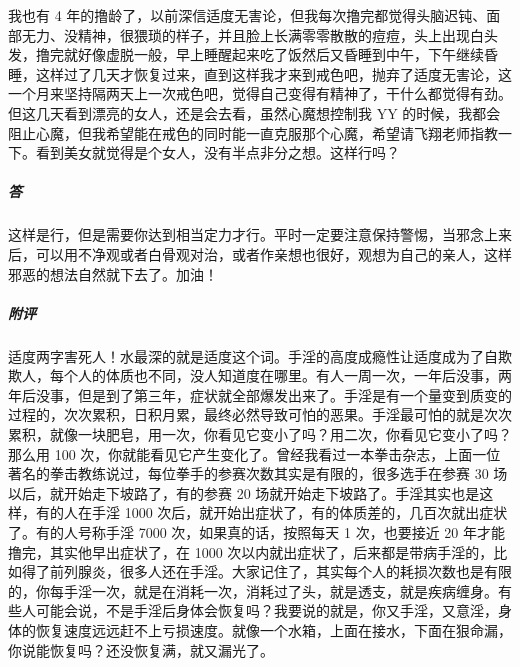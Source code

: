 \begin{case}
    我也有 4 年的撸龄了，以前深信适度无害论，但我每次撸完都觉得头脑迟钝、面部无力、没精神，很猥琐的样子，并且脸上长满零零散散的痘痘，头上出现白头发，撸完就好像虚脱一般，早上睡醒起来吃了饭然后又昏睡到中午，下午继续昏睡，这样过了几天才恢复过来，直到这样我才来到戒色吧，抛弃了适度无害论，这一个月来坚持隔两天上一次戒色吧，觉得自己变得有精神了，干什么都觉得有劲。但这几天看到漂亮的女人，还是会去看，虽然心魔想控制我 YY 的时候，我都会阻止心魔，但我希望能在戒色的同时能一直克服那个心魔，希望请飞翔老师指教一下。看到美女就觉得是个女人，没有半点非分之想。这样行吗？
    \subparagraph{答} 这样是行，但是需要你达到相当定力才行。平时一定要注意保持警惕，当邪念上来后，可以用不净观或者白骨观对治，或者作亲想也很好，观想为自己的亲人，这样邪恶的想法自然就下去了。加油！
    \subparagraph{附评} 适度两字害死人！水最深的就是适度这个词。手淫的高度成瘾性让适度成为了自欺欺人，每个人的体质也不同，没人知道度在哪里。有人一周一次，一年后没事，两年后没事，但是到了第三年，症状就全部爆发出来了。手淫是有一个量变到质变的过程的，次次累积，日积月累，最终必然导致可怕的恶果。手淫最可怕的就是次次累积，就像一块肥皂，用一次，你看见它变小了吗？用二次，你看见它变小了吗？那么用 100 次，你就能看见它产生变化了。曾经我看过一本拳击杂志，上面一位著名的拳击教练说过，每位拳手的参赛次数其实是有限的，很多选手在参赛 30 场以后，就开始走下坡路了，有的参赛 20 场就开始走下坡路了。手淫其实也是这样，有的人在手淫 1000 次后，就开始出症状了，有的体质差的，几百次就出症状了。有的人号称手淫 7000 次，如果真的话，按照每天 1 次，也要接近 20 年才能撸完，其实他早出症状了，在 1000 次以内就出症状了，后来都是带病手淫的，比如得了前列腺炎，很多人还在手淫。大家记住了，其实每个人的耗损次数也是有限的，你每手淫一次，就是在消耗一次，消耗过了头，就是透支，就是疾病缠身。有些人可能会说，不是手淫后身体会恢复吗？我要说的就是，你又手淫，又意淫，身体的恢复速度远远赶不上亏损速度。就像一个水箱，上面在接水，下面在狠命漏，你说能恢复吗？还没恢复满，就又漏光了。


\end{case}
